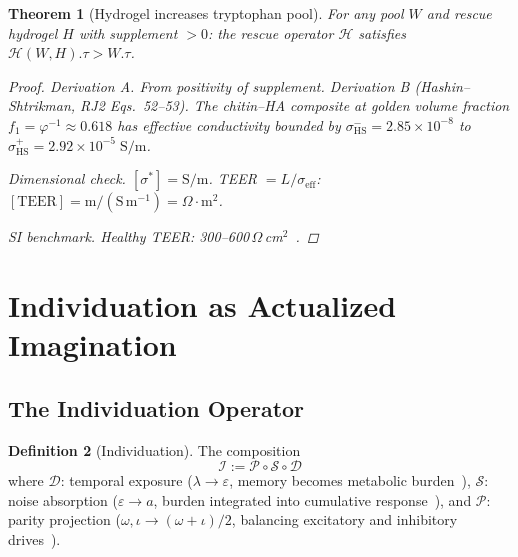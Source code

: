 \documentclass[12pt,oneside]{article}
\theoremstyle{principia}
\newtheorem{theorem}{Theorem}[section]
\theoremstyle{definition}
\newtheorem{definition}[theorem]{Definition}
\theoremstyle{remark}
\begin{document}
\begin{theorem}[Hydrogel increases tryptophan pool]
For any pool $W$ and rescue hydrogel $H$ with supplement $> 0$:
the rescue operator $\mathcal{H}$ satisfies
$\mathcal{H}(W, H).\tau > W.\tau$.

\begin{proof}
\emph{Derivation A.} From positivity of supplement.
\emph{Derivation B (Hashin--Shtrikman, RJ2 Eqs.~52--53).}
The chitin--HA composite at golden volume fraction $f_1 = \varphi^{-1} \approx 0.618$
has effective conductivity bounded by
$\sigma^-_\mathrm{HS} = 2.85\times10^{-8}$ to
$\sigma^+_\mathrm{HS} = 2.92\times10^{-5}\;\mathrm{S/m}$.

\emph{Dimensional check.} $[\sigma^*] = \mathrm{S/m}$. TEER $= L/\sigma_\mathrm{eff}$:
$[\mathrm{TEER}] = \mathrm{m/(S\,m^{-1})} = \Omega\cdot\mathrm{m}^2$. \checkmark

\emph{SI benchmark.}
Healthy TEER: 300--600\,$\Omega$\,cm$^2$~\cite{srinivasan15}.
\qedhere
\end{proof}
\end{theorem}

\section{Individuation as Actualized Imagination}

\subsection{The Individuation Operator}

\begin{definition}[Individuation]
The composition
\begin{equation}
  \mathcal{I} := \mathcal{P} \circ \mathcal{S} \circ \mathcal{D}
\end{equation}
where $\mathcal{D}$: temporal exposure ($\lambda \to \varepsilon$,
memory becomes metabolic burden~\cite{lc}),
$\mathcal{S}$: noise absorption ($\varepsilon \to a$,
burden integrated into cumulative response~\cite{lc}), and
$\mathcal{P}$: parity projection ($\omega, \iota \to (\omega+\iota)/2$,
balancing excitatory and inhibitory drives~\cite{dwm}).
\end{definition}
\end{document}

